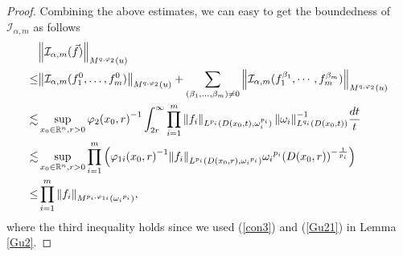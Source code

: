 \documentclass[11pt, twoside, leqno]{article}
\begin{document}
\begin{proof}[Proof]
	Combining the above estimates, we can easy to get the boundedness of ${{\mathcal I}_{\alpha,m}}$ as follows
	\begin{align*}
	&{\left\| {{\mathcal I}_{\alpha,m}(\vec f)} \right\|_{{M^{q,{\varphi _2}}}\left( {{u}} \right)}}\\
	\le& {\left\| {{\mathcal I}_{\alpha,m}(f_1^0, \ldots ,f_m^0)} \right\|_{{M^{q,{\varphi _2}}}\left( {{u}} \right)}} + \sum\limits_{({\beta _1}, \ldots ,{\beta _m}) \ne 0} {{{\left\| {{\mathcal I}_{\alpha,m}(f_1^{{\beta _1}}, \cdots ,f_m^{{\beta _m}})} \right\|}_{{M^{q,{\varphi _2}}}\left( {{u}} \right)}}}\\
	\lesssim& \mathop {\sup }\limits_{{x_0} \in {\mathbb R^n},r > 0} {\varphi _2}{\left( {{x_0},r} \right)^{ - 1}}\int_{2r}^\infty  {\prod\limits_{i = 1}^m {{{\left\| {{f_i}} \right\|}_{{L^{{p_i}}}(D({x_0},t),\omega _i^{{p_i}})}}\left\| {{\omega _i}} \right\|_{{L^{{q_i}}}(D({x_0},t))}^{ - 1}} \frac{{dt}}{t}}\notag\\
	\lesssim&\mathop {\sup }\limits_{{x_0} \in {\mathbb R^n},r > 0} \prod\limits_{i = 1}^m {\left( {{\varphi _{1i}}{{\left( {{x_0},r} \right)}^{ - 1}}{{\left\| {{f_i}} \right\|}_{{L^{{p_i}}}(D({x_0},r),{\omega _i}^{{p_i}})}}{\omega _i}^{{p_i}}{{\left( {D({x_0},r)} \right)}^{ - \frac{1}{{{p_i}}}}}} \right)}\notag\\
	\le& \prod\limits_{i = 1}^m {{{\left\| {{f_i}} \right\|}_{{M^{{p_i},{\varphi _{1i}}}}({{\omega _i}^{{p_i}}})}}},
	\end{align*}
	where the third inequality holds since we used (\ref{con3}) and (\ref{Gu21}) in Lemma \ref{Gu2}.
\end{proof}
\end{document}
